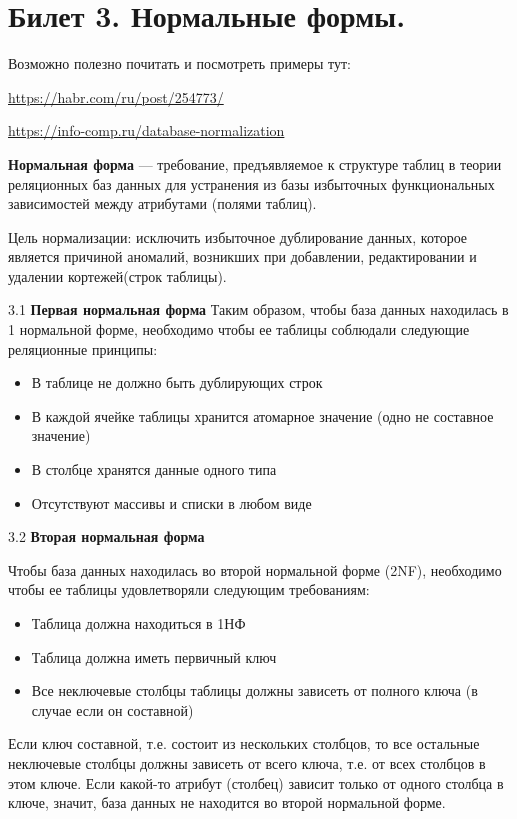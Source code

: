 \newpage
\section {Билет 3. Нормальные формы.}

Возможно полезно почитать и посмотреть примеры тут:

\url{https://habr.com/ru/post/254773/} 

\url{https://info-comp.ru/database-normalization}

\textbf{Нормальная форма} — требование, предъявляемое к структуре таблиц в теории реляционных баз данных для устранения из базы избыточных функциональных зависимостей между атрибутами (полями таблиц).

Цель нормализации: исключить избыточное дублирование данных, которое является причиной аномалий, возникших при добавлении, редактировании и удалении кортежей(строк таблицы).

3.1 \textbf{Первая нормальная форма}
Таким образом, чтобы база данных находилась в 1 нормальной форме, необходимо чтобы ее таблицы соблюдали следующие реляционные принципы:

\begin{itemize}
	\item В таблице не должно быть дублирующих строк
	\item В каждой ячейке таблицы хранится атомарное значение (одно не составное значение)
	\item В столбце хранятся данные одного типа
	\item Отсутствуют массивы и списки в любом виде
\end{itemize}

3.2 \textbf{Вторая нормальная форма}

Чтобы база данных находилась во второй нормальной форме (2NF), необходимо чтобы ее таблицы удовлетворяли следующим требованиям:

\begin{itemize}
	\item Таблица должна находиться в 1НФ
	\item Таблица должна иметь первичный ключ
	\item Все неключевые столбцы таблицы должны зависеть от полного ключа (в случае если он составной)
\end{itemize}

Если ключ составной, т.е. состоит из нескольких столбцов, то все остальные неключевые столбцы должны зависеть от всего ключа, т.е. от всех столбцов в этом ключе. Если какой-то атрибут (столбец) зависит только от одного столбца в ключе, значит, база данных не находится во второй нормальной форме.

